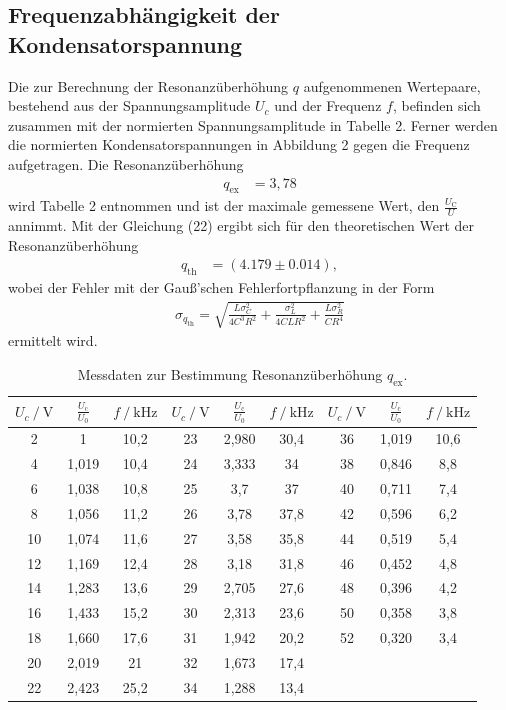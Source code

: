 \subsection{Frequenzabhängigkeit der Kondensatorspannung}
Die zur Berechnung der Resonanzüberhöhung $q$ aufgenommenen Wertepaare, bestehend aus der Spannungsamplitude $U_c$ und der Frequenz $f$, befinden sich zusammen mit der
normierten Spannungsamplitude in Tabelle 2. Ferner werden die normierten Kondensatorspannungen in Abbildung 2 gegen die Frequenz aufgetragen.
Die Resonanzüberhöhung 
\begin{align*}
q_\text{ex} &= 3,78
\end{align*}
wird Tabelle 2 entnommen und ist der maximale gemessene Wert, den $\frac{U_\text{C}}{U}$ annimmt. Mit der Gleichung (22) ergibt sich für den theoretischen Wert der Resonanzüberhöhung 
\begin{align*}
q_\text{th} &= (4.179 \pm 0.014),
\end{align*}
wobei der Fehler mit der Gauß'schen Fehlerfortpflanzung in der Form
\begin{align*}
\sigma_{q_\text{th}} = \sqrt{\frac{L \sigma_{C}^{2}}{4C^{3} R^{2}} + \frac{\sigma_{L}^{2}}{4C L R^{2}} + \frac{L \sigma_{R}^{2}}{C R^{4}}}
\end{align*}
ermittelt wird.

\begin{table}
\centering
\caption{Messdaten zur Bestimmung Resonanzüberhöhung $q_\text{ex}$.}
\label{tab:some_data}
\begin{tabular}{c c c c c c c c c}
\toprule
$\mathit{U_\text{c} \: / \: \mathrm{V}}$ & $\frac{U_\text{c}}{U_0}$ & $\mathit{f \: / \: \mathrm{kHz}}$ & $\mathit{U_\text{c} \: / \: \mathrm{V}}$ & $\frac{U_\text{c}}{U_0}$ & $\mathit{f \: / \: \mathrm{kHz}}$ & $\mathit{U_\text{c} \: / \: \mathrm{V}}$ & $\frac{U_\text{c}}{U_0}$ & $\mathit{f \: / \: \mathrm{kHz}}$ \\
\midrule
2  & 1     & 10,2 & 23 & 2,980  & 30,4 & 36 & 1,019  & 10,6 \\
4  & 1,019  & 10,4 & 24 & 3,333  & 34 & 38 & 0,846  &  8,8 \\
6  & 1,038  & 10,8 & 25 & 3,7    & 37 & 40 & 0,711  &  7,4 \\
8  & 1,056  & 11,2 & 26 & 3,78   & 37,8 & 42 & 0,596  &  6,2 \\
10 & 1,074  & 11,6 & 27 & 3,58   & 35,8 & 44 & 0,519  &  5,4 \\
12 & 1,169  & 12,4 & 28 & 3,18   & 31,8 & 46 & 0,452  &  4,8 \\
14 & 1,283  & 13,6 & 29 & 2,705  & 27,6 & 48 & 0,396  &  4,2 \\
16 & 1,433  & 15,2 & 30 & 2,313  & 23,6 & 50 & 0,358  &  3,8 \\
18 & 1,660  & 17,6 & 31 & 1,942  & 20,2 & 52 & 0,320  &  3,4 \\
20 & 2,019  & 21 & 32 & 1,673  & 17,4 & & & \\
22 & 2,423  & 25,2 & 34 & 1,288  & 13,4 & & & \\
\bottomrule
\end{tabular}
\end{table}

